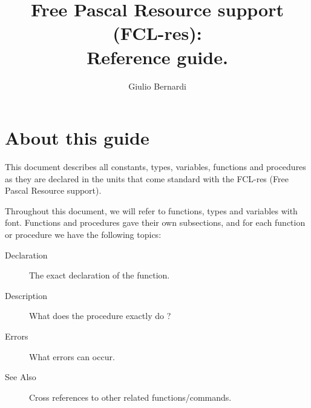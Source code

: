 %
%
%
%
%

\ifpdf
\fi
%
%
\makeindex
\usepackage{tabularx}
%
%

\title{Free Pascal Resource support (FCL-res): \\ Reference guide.}
\label{rtl}

\author{Giulio Bernardi}
\maketitle
\tableofcontents
\newpage

\section*{About this guide}
This document describes all constants, types, variables, functions and
procedures as they are declared in the units that come standard with the 
FCL-res (Free Pascal Resource support).

Throughout this document, we will refer to functions, types and variables
with  font. Functions and procedures gave their own
subsections, and for each function or procedure we have the following
topics:
\begin{description}
\item [Declaration] The exact declaration of the function.
\item [Description] What does the procedure exactly do ?
\item [Errors] What errors can occur.
\item [See Also] Cross references to other related functions/commands.
\end{description}



